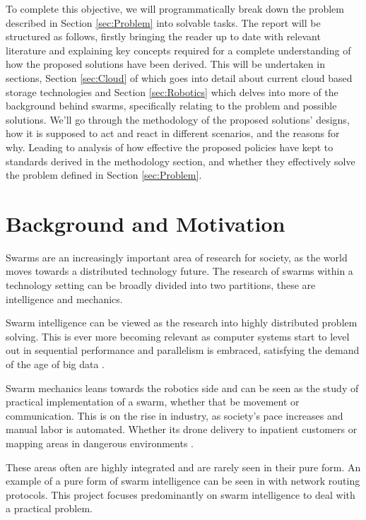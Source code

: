 \documentclass{UoYCSproject}
\begin{document}
To complete this objective, we will programmatically break down the problem described in Section \ref{sec:Problem} into solvable tasks.
The report will be structured as follows, firstly bringing the reader up to date with relevant literature and explaining key concepts required for a complete understanding of how the proposed solutions have been derived.
This will be undertaken in sections, Section \ref{sec:Cloud} of which goes into detail about current cloud based storage technologies and Section \ref{sec:Robotics} which delves into more of the background behind swarms, specifically relating to the problem and possible solutions.
We’ll go through the methodology of the proposed solutions’ designs, how it is supposed to act and react in different scenarios, and the reasons for why.
Leading to analysis of how effective the proposed policies have kept to standards derived in the methodology section, and whether they effectively solve the problem defined in Section \ref{sec:Problem}.


\section{Background and Motivation}
\label{sec:Motivation}

Swarms are an increasingly important area of research for society, as the world moves towards a distributed technology future.
The research of swarms within a technology setting can be broadly divided into two partitions, these are intelligence and mechanics.

Swarm intelligence can be viewed as the research into highly distributed problem solving\cite{Cognitive maps mine detection, Swarm intellegiegence}.
This is ever more becoming relevant as computer systems start to level out in sequential performance \cite{CPU speed} and parallelism is embraced, satisfying the demand of the age of big data \cite{Avalability storage}.

Swarm mechanics leans towards the robotics side and can be seen as the study of practical implementation of a swarm, whether that be movement or communication.
This is on the rise in industry, as society's pace increases and manual labor is automated. Whether its drone delivery to inpatient customers or mapping areas in dangerous environments \cite{Swarm robotics reviewed}.

These areas often are highly integrated and are rarely seen in their pure form.
An example of a pure form of swarm intelligence can be seen in \cite{Swarm intellegiegence} with network routing protocols.
This project focuses predominantly on swarm intelligence to deal with a practical problem.
\end{document}
